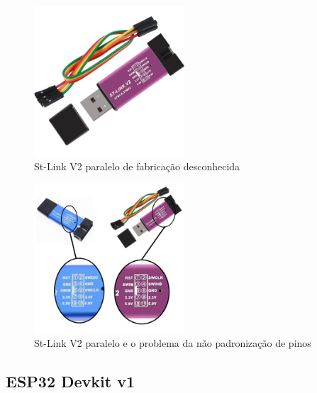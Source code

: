 \begin{figure}[ht]
	\centering
	\includegraphics[width=0.5\textwidth]{figures/stlinkv2_cheap}
	\caption{St-Link V2 paralelo de fabricação desconhecida}
    \label{stlinkv2_cheap}
\end{figure}


\begin{figure}[ht]
	\centering
	\includegraphics[width=0.5\textwidth]{figures/stlinkv2_cheap_pin_diff}
	\caption{St-Link V2 paralelo e o problema da não padronização de pinos}
    \label{stlinkv2_cheap}
\end{figure}





\subsection{ESP32 Devkit v1}









